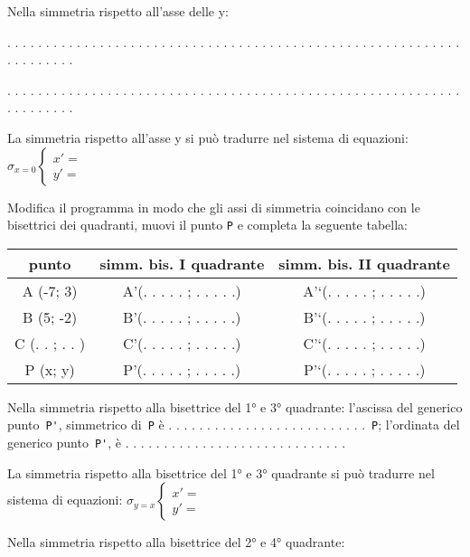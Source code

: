 Nella simmetria rispetto all'asse delle y:

. . . . . . . . . . . . . . . . . . . . . . . . . . . . . . . . . . . . . . . .
. . . . . . . . . . . . . . . . . . . . . . . . . . . .

. . . . . . . . . . . . . . . . . . . . . . . . . . . . . . . . . . . . . . . .
. . . . . . . . . . . . . . . . . . . . . . . . . . . .

La simmetria rispetto all'asse y si può tradurre nel sistema di equazioni:
\(\sigma_{x = 0} \left \{
\begin{array}{l}
x' = {} \\
y' = {}
\end{array} \right .\)

Modifica il programma in modo che gli assi di simmetria coincidano con le
bisettrici dei quadranti, muovi il punto \lstinline{P} e completa la seguente 
tabella:

\begin{center}\begin{tabular}{|c|c|c|}
\hline

punto
 & 
simm. bis. I quadrante
 & 
simm. bis. II quadrante
\\
\hline
A (-7; 3)
 & 
A'(. . . . . ; . . . . .)
 & 
A'`(. . . . . ; . . . . .)
\\
\hline
B (5; -2)
 & 
B'(. . . . . ; . . . . .)
 & 
B'`(. . . . . ; . . . . .)
\\
\hline
C (. . ; . . )
 & 
C'(. . . . . ; . . . . .)
 & 
C'`(. . . . . ; . . . . .)
\\
\hline
P (x; y)
 & 
P'(. . . . . ; . . . . .)
 & 
P'`(. . . . . ; . . . . .)
\\
\hline\end{tabular}\end{center}


Nella simmetria rispetto alla bisettrice del 1° e 3° quadrante:
l'ascissa del generico punto~\lstinline{P'}, simmetrico di~\lstinline{P}
è . . . . . . . . . . . . . . . . . . . . . . . . . .~\lstinline{P};
l'ordinata del generico punto~\lstinline{P'},
è . . . . . . . . . . . . . . . . . . . . . . . . . . . . .

La simmetria rispetto alla bisettrice del 1° e 3° quadrante si può tradurre
nel sistema di equazioni:
\(\sigma_{y = x} \left \{
\begin{array}{l}
x' = {} \\
y' = {}
\end{array} \right .\)

Nella simmetria rispetto alla bisettrice del 2° e 4° quadrante:


